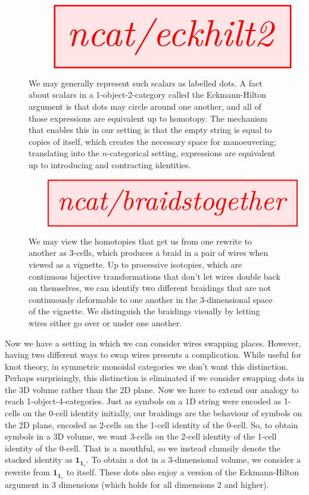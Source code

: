 \begin{figure}
\centering
\[\resizebox{\textwidth}{!}{\tikzfig{ncat/eckhilt2}}\]
\caption{We may generally represent such scalars as labelled dots. A fact about scalars in a 1-object-2-category called the Eckmann-Hilton argument is that dots may circle around one another, and all of those expressions are equivalent up to homotopy. The mechanism that enables this in our setting is that the empty string is equal to copies of itself, which creates the necessary space for manoeuvering; translating into the $n$-categorical setting, expressions are equivalent up to introducing and contracting identities.}
\end{figure}

\begin{figure}[h!]
\centering
\[\resizebox{\textwidth}{!}{\tikzfig{ncat/braidstogether}}\]
\caption{We may view the homotopies that get us from one rewrite to another as 3-cells, which produces a braid in a pair of wires when viewed as a vignette. Up to processive isotopies, which are continuous bijective transformations that don't let wires double back on themselves, we can identify two different braidings that are not continuously deformable to one another in the 3-dimensional space of the vignette. We distinguish the braidings visually by letting wires either go over or under one another.}
\end{figure}

\newpage

Now we have a setting in which we can consider wires swapping places. However, having two different ways to swap wires presents a complication. While useful for knot theory, in symmetric monoidal categories we don't want this distinction. Perhaps surprisingly, this distinction is eliminated if we consider swapping dots in the 3D volume rather than the 2D plane. Now we have to extend our analogy to reach 1-object-4-categories. Just as symbols on a 1D string were encoded as 1-cells on the 0-cell identity initially, our braidings are the behaviour of symbols on the 2D plane, encoded as 2-cells on the 1-cell identity of the 0-cell. So, to obtain symbols in a 3D volume, we want 3-cells on the 2-cell identity of the 1-cell identity of the 0-cell. That is a mouthful, so we instead clumsily denote the stacked identity as $\textbf{1}_{\textbf{1}_\star}$. To obtain a dot in a 3-dimensional volume, we consider a rewrite from $\textbf{1}_{\textbf{1}_\star}$ to itself. These dots also enjoy a version of the Eckmann-Hilton argument in 3 dimensions (which holds for all dimensions 2 and higher).

